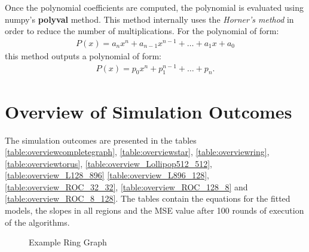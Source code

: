 Once the polynomial coefficients are computed, the polynomial is evaluated using numpy's \textbf{polyval} method. This method internally uses the \textit{Horner's method} in order to reduce the number of multiplications. For the polynomial of form:
\begin{align}
    P(x) = a_{n}x^{n}+a_{n-1}x^{n-1}+ \dots + a_{1}x+a_{0}
\end{align}
this method outputs a polynomial of form:
\begin{align}
    P(x)=p_{0}x^{n}+p_{1}^{n-1}+\dots + p_{n}.
\end{align}
\cite{wolfram_horner}

\section{Overview of Simulation Outcomes}\label{sec:overviewSimOutcomes}
The simulation outcomes are presented in the tables \ref{table:overviewcompletegraph}, \ref{table:overviewstar}, \ref{table:overviewring}, \ref{table:overviewtorus}, \ref{table:overview_Lollipop512_512}, \ref{table:overview_L128_896} \ref{table:overview_L896_128}, \ref{table:overview_ROC_32_32}, \ref{table:overview_ROC_128_8} and \ref{table:overview_ROC_8_128}. The tables contain the equations for the fitted models, the slopes in all regions and the MSE value after 100 rounds of execution of the algorithms.













\begin{figure}
    \centering
    \caption{Example Ring Graph}
    \label{fig:exampleRingProblem}
\end{figure}
